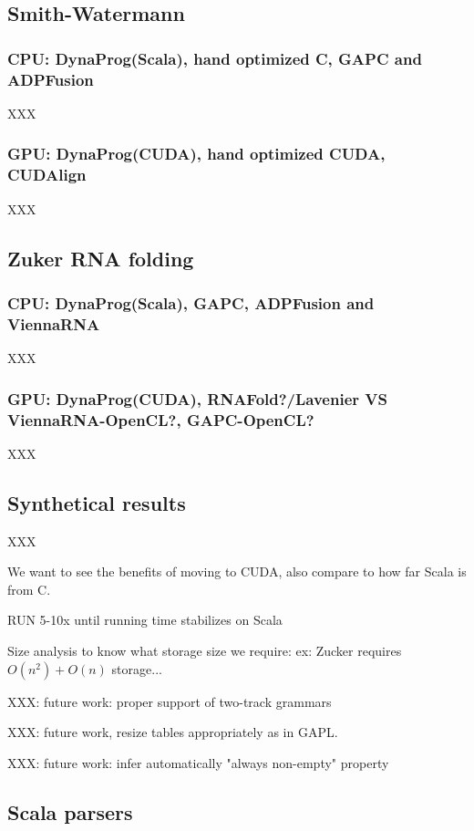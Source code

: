 \subsection{Smith-Watermann}
\subsubsection{CPU: DynaProg(Scala), hand optimized C, GAPC and ADPFusion}
XXX

\subsubsection{GPU: DynaProg(CUDA), hand optimized CUDA, CUDAlign}
XXX

\subsection{Zuker RNA folding}
\subsubsection{CPU: DynaProg(Scala), GAPC, ADPFusion and ViennaRNA}
XXX

\subsubsection{GPU: DynaProg(CUDA), RNAFold?/Lavenier VS ViennaRNA-OpenCL?, GAPC-OpenCL?}
XXX

\subsection{Synthetical results}
XXX

{\color{red} We want to see the benefits of moving to CUDA, also compare to how far Scala is from C.}

RUN 5-10x until running time stabilizes on Scala

 {\color{red} Size analysis to know what storage size we require: ex: Zucker requires $O(n^2)+O(n)$ storage...}

XXX: future work: proper support of two-track grammars

XXX: future work, resize tables appropriately as in GAPL.

XXX: future work: infer automatically "always non-empty" property

\subsection{Scala parsers}

